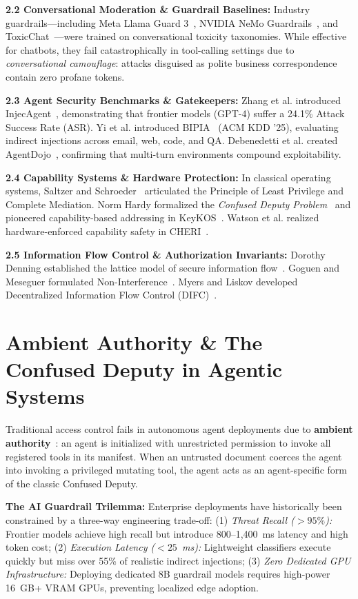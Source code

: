 \documentclass[10pt,journal,compsoc]{IEEEtran}
\begin{document}
\textbf{2.2 Conversational Moderation \& Guardrail Baselines:} Industry guardrails---including Meta Llama Guard 3~\cite{ref_7}, NVIDIA NeMo Guardrails~\cite{ref_8}, and ToxicChat~\cite{ref_17}---were trained on conversational toxicity taxonomies. While effective for chatbots, they fail catastrophically in tool-calling settings due to \textit{conversational camouflage}: attacks disguised as polite business correspondence contain zero profane tokens.

\textbf{2.3 Agent Security Benchmarks \& Gatekeepers:} Zhang et al. introduced InjecAgent~\cite{ref_5}, demonstrating that frontier models (GPT-4) suffer a 24.1\% Attack Success Rate (ASR). Yi et al. introduced BIPIA~\cite{ref_4} (ACM KDD '25), evaluating indirect injections across email, web, code, and QA. Debenedetti et al. created AgentDojo~\cite{ref_26}, confirming that multi-turn environments compound exploitability.

\textbf{2.4 Capability Systems \& Hardware Protection:} In classical operating systems, Saltzer and Schroeder~\cite{ref_9} articulated the Principle of Least Privilege and Complete Mediation. Norm Hardy formalized the \textit{Confused Deputy Problem}~\cite{ref_6} and pioneered capability-based addressing in KeyKOS~\cite{ref_10}. Watson et al. realized hardware-enforced capability safety in CHERI~\cite{ref_33}.

\textbf{2.5 Information Flow Control \& Authorization Invariants:} Dorothy Denning established the lattice model of secure information flow~\cite{ref_19}. Goguen and Meseguer formulated Non-Interference~\cite{ref_25}. Myers and Liskov developed Decentralized Information Flow Control (DIFC)~\cite{ref_32}.

\section{Ambient Authority \& The Confused Deputy in Agentic Systems}
Traditional access control fails in autonomous agent deployments due to \textbf{ambient authority}~\cite{ref_6}: an agent is initialized with unrestricted permission to invoke all registered tools in its manifest. When an untrusted document coerces the agent into invoking a privileged mutating tool, the agent acts as an agent-specific form of the classic Confused Deputy.

\textbf{The AI Guardrail Trilemma:} Enterprise deployments have historically been constrained by a three-way engineering trade-off: (1) \textit{Threat Recall ($>95\%$):} Frontier models achieve high recall but introduce 800--1,400~ms latency and high token cost; (2) \textit{Execution Latency ($<25$~ms):} Lightweight classifiers execute quickly but miss over 55\% of realistic indirect injections; (3) \textit{Zero Dedicated GPU Infrastructure:} Deploying dedicated 8B guardrail models requires high-power 16~GB+ VRAM GPUs, preventing localized edge adoption.
\end{document}
